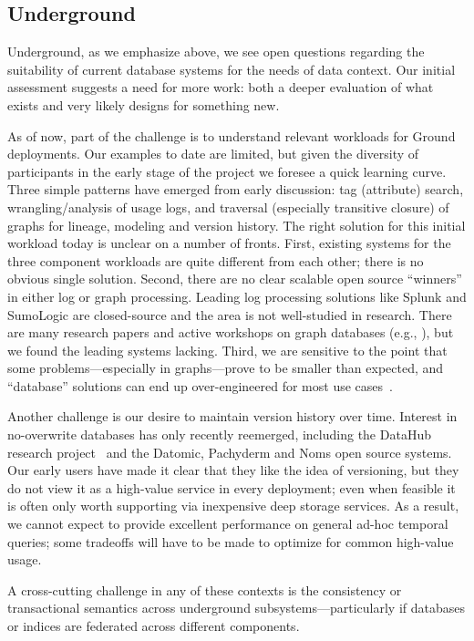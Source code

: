 \documentclass{sig-alternate}
\begin{document}
\subsection{Underground}
Underground, as we emphasize above, we see open questions regarding the suitability of current database systems for the needs of data context. Our initial assessment suggests a need for more work: both a deeper evaluation of what exists and very likely designs for something new. 

As of now, part of the challenge is to understand relevant workloads for Ground deployments.  Our examples to date are limited, but given the diversity of participants in the early stage of the project we foresee a quick learning curve. Three simple patterns have emerged from early discussion: tag (attribute) search, wrangling/analysis of usage logs, and traversal (especially transitive closure) of graphs for lineage, modeling and version history. The right solution for this initial workload today is unclear on a number of fronts. First, existing systems for the three component workloads are quite different from each other; there is no obvious single solution. Second, there are no clear scalable open source ``winners'' in either log or graph processing. Leading log processing solutions like Splunk and SumoLogic are closed-source and the area is not well-studied in research. There are many research papers and active workshops on graph databases (e.g., \cite{grades16}), but we found the leading systems lacking.  Third, we are sensitive to the point that some problems---especially in graphs---prove to be smaller than expected, and ``database'' solutions can end up over-engineered for most use cases~\cite{mcsherry}. 

Another challenge is our desire to maintain version history over time. Interest in no-overwrite databases has only recently reemerged, including the DataHub research project~\cite{datahub} and the Datomic, Pachyderm and Noms open source systems. Our early users have made it clear that they like the idea of versioning, but they do not view it as a high-value service in every deployment; even when feasible it is often only worth supporting via inexpensive deep storage services. As a result, we cannot expect to provide excellent performance on general ad-hoc temporal queries; some tradeoffs will have to be made to optimize for common high-value usage.  

A cross-cutting challenge in any of these contexts is the consistency or transactional semantics across underground subsystems---particularly if databases or indices are federated across different components.
\end{document}
